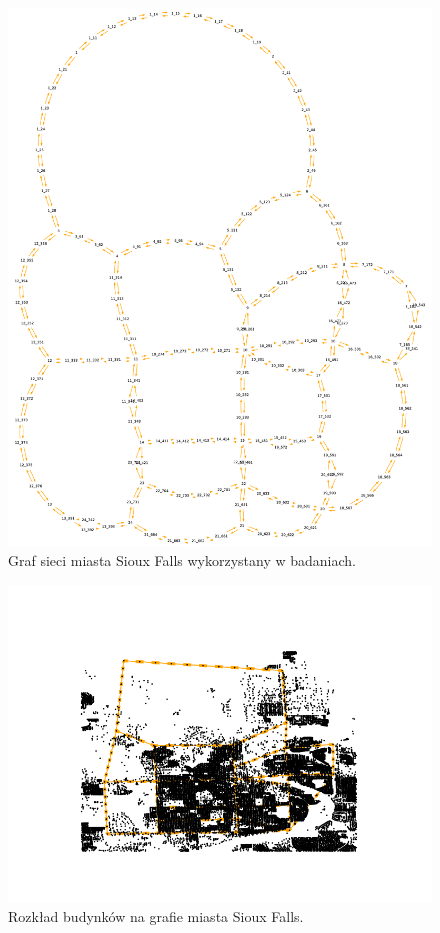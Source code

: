 \documentclass[twoside,12pt]{report}
\begin{document}
\begin{figure}[ht]
\centering
\includegraphics[totalheight=0.580\textheight]{img/sioux/network}
\caption{Graf sieci miasta Sioux Falls wykorzystany w badaniach.} 
\label{siouxsiec}
\end{figure}

\begin{figure}[ht]
\centering
\includegraphics[width=1.2\textwidth]{img/sioux/facilities}
\caption{Rozkład budynków na grafie miasta Sioux Falls.} 
\label{siouxbudynki}
\end{figure}
\end{document}
